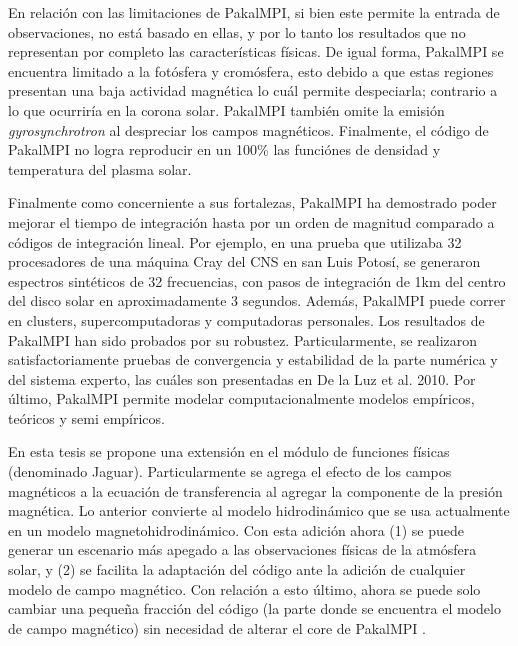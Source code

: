\documentclass[9pt]{book}
\begin{document}
En relaci\'on con las limitaciones de PakalMPI, si bien este permite la entrada de observaciones, no est\'a basado en ellas, y por lo tanto los resultados que no representan por completo las caracter\'isticas f\'isicas. De igual forma, PakalMPI se encuentra limitado a la fot\'osfera y crom\'osfera, esto debido a que estas regiones presentan una baja actividad magn\'etica lo cu\'al permite despeciarla; contrario a lo que ocurrir\'ia en la corona solar. PakalMPI tambi\'en omite la emisi\'on \emph{gyrosynchrotron} al despreciar los campos magn\'eticos. Finalmente, el c\'odigo de PakalMPI no logra reproducir en un 100\% las funci\'ones de densidad y temperatura del plasma solar.
 
Finalmente como concerniente a sus fortalezas, PakalMPI ha demostrado poder mejorar el tiempo de integraci\'on hasta por un orden de magnitud comparado a c\'odigos de integraci\'on lineal. Por ejemplo, en una prueba que utilizaba 32 procesadores de una m\'aquina Cray del CNS en san Luis Potos\'i, se generaron espectros sint\'eticos de 32 frecuencias, con pasos de integraci\'on de 1km del centro del disco solar en aproximadamente 3 segundos. Adem\'as, PakalMPI puede correr en clusters, supercomputadoras y computadoras personales. Los resultados de PakalMPI han sido probados por su robustez. Particularmente, se realizaron satisfactoriamente pruebas de convergencia y estabilidad de la parte num\'erica y del sistema experto, las cu\'ales son presentadas en De la Luz et al. 2010. Por \'ultimo, PakalMPI permite modelar computacionalmente modelos emp\'iricos, te\'oricos y semi emp\'iricos. 

En esta tesis se propone una extensi\'on en el m\'odulo de funciones f\'isicas (denominado Jaguar). Particularmente se agrega el efecto de los campos magn\'eticos a la ecuaci\'on de transferencia al agregar la componente de la presi\'on magn\'etica. Lo anterior convierte al modelo hidrodin\'amico que se usa actualmente en un modelo magnetohidrodin\'amico. Con esta adici\'on ahora (1) se puede generar un escenario m\'as apegado a las observaciones f\'isicas de la atm\'osfera solar, y (2) se facilita la adaptaci\'on del c\'odigo ante la adici\'on de cualquier modelo de campo magn\'etico. Con relaci\'on a esto \'ultimo, ahora se puede solo cambiar una peque\~na fracci\'on del c\'odigo (la parte donde se encuentra el modelo de campo magn\'etico) sin necesidad de alterar el core de PakalMPI . 
\end{document}
